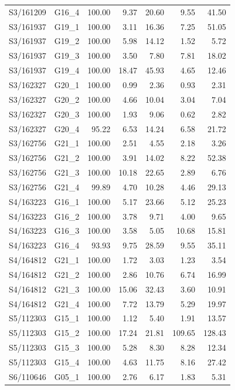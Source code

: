 \begin{longtable}{llrrrrr}
S3/161209 & G16\_4 & 100.00 & 9.37 & 20.60 & 9.55 & 41.50 \\
S3/161937 & G19\_1 & 100.00 & 3.11 & 16.36 & 7.25 & 51.05 \\
S3/161937 & G19\_2 & 100.00 & 5.98 & 14.12 & 1.52 & 5.72 \\
S3/161937 & G19\_3 & 100.00 & 3.50 & 7.80 & 7.81 & 18.02 \\
S3/161937 & G19\_4 & 100.00 & 18.47 & 45.93 & 4.65 & 12.46 \\
S3/162327 & G20\_1 & 100.00 & 0.99 & 2.36 & 0.93 & 2.31 \\
S3/162327 & G20\_2 & 100.00 & 4.66 & 10.04 & 3.04 & 7.04 \\
S3/162327 & G20\_3 & 100.00 & 1.93 & 9.06 & 0.62 & 2.82 \\
S3/162327 & G20\_4 & 95.22 & 6.53 & 14.24 & 6.58 & 21.72 \\
S3/162756 & G21\_1 & 100.00 & 2.51 & 4.55 & 2.18 & 3.26 \\
S3/162756 & G21\_2 & 100.00 & 3.91 & 14.02 & 8.22 & 52.38 \\
S3/162756 & G21\_3 & 100.00 & 10.18 & 22.65 & 2.89 & 6.76 \\
S3/162756 & G21\_4 & 99.89 & 4.70 & 10.28 & 4.46 & 29.13 \\
S4/163223 & G16\_1 & 100.00 & 5.17 & 23.66 & 5.12 & 25.23 \\
S4/163223 & G16\_2 & 100.00 & 3.78 & 9.71 & 4.00 & 9.65 \\
S4/163223 & G16\_3 & 100.00 & 3.58 & 5.05 & 10.68 & 15.81 \\
S4/163223 & G16\_4 & 93.93 & 9.75 & 28.59 & 9.55 & 35.11 \\
S4/164812 & G21\_1 & 100.00 & 1.72 & 3.03 & 1.23 & 3.54 \\
S4/164812 & G21\_2 & 100.00 & 2.86 & 10.76 & 6.74 & 16.99 \\
S4/164812 & G21\_3 & 100.00 & 15.06 & 32.43 & 3.60 & 10.91 \\
S4/164812 & G21\_4 & 100.00 & 7.72 & 13.79 & 5.29 & 19.97 \\
S5/112303 & G15\_1 & 100.00 & 1.12 & 5.40 & 1.91 & 13.57 \\
S5/112303 & G15\_2 & 100.00 & 17.24 & 21.81 & 109.65 & 128.43 \\
S5/112303 & G15\_3 & 100.00 & 5.28 & 8.30 & 8.28 & 12.34 \\
S5/112303 & G15\_4 & 100.00 & 4.63 & 11.75 & 8.16 & 27.42 \\
S6/110646 & G05\_1 & 100.00 & 2.76 & 6.17 & 1.83 & 5.31 \\

\end{longtable}
